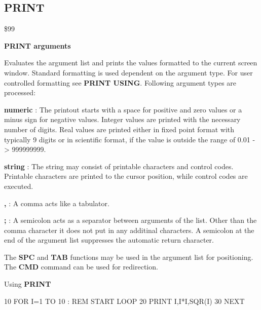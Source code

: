 \subsection{PRINT}
\begin{description}[leftmargin=3cm,style=nextline]
\item [Token:] \$99
\item [Format:] {\bf PRINT arguments}
\item [Usage:]  Evaluates the argument list and prints the values
                formatted to the current screen window.
                Standard formatting is used dependent on the
                argument type. For user controlled formatting
                see {\bf PRINT USING}.
                Following argument types are processed:

                {\bf numeric} : The printout starts with a space
                for positive and zero values or a minus sign for
                negative values. Integer values are printed with
                the necessary number of digits. Real values are
                printed either in fixed point format with typically
                9 digits or in scientific format, if the value is
                outside the range of 0.01 -> 999999999.

                {\bf string} : The string may consist of printable
                characters and control codes. Printable characters
                are printed to the cursor position, while control
                codes are executed.

                {\bf ,} : A comma acts like a tabulator.

                {\bf ;} : A semicolon acts as a separator between
                arguments of the list. Other than the comma character
                it does not put in any additinal characters.
                A semicolon at the end of the argument list suppresses
                the automatic return character.

\item [Remarks:] The {\bf SPC} and {\bf TAB} functions
                 may be used in the argument list
                 for positioning.
                 The {\bf CMD} command can be used for redirection.

\item [Example:] Using {\bf PRINT}

\begin{screenoutput}
 10 FOR I=1 TO 10    : REM START LOOP
 20 PRINT I,I*I,SQR(I)
 30 NEXT
\end{screenoutput}
\end{description}


